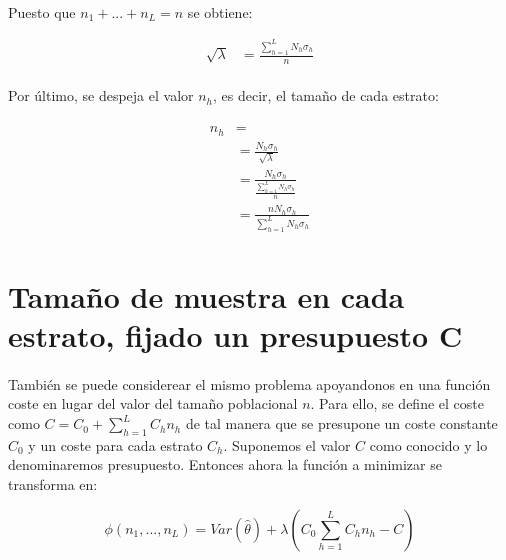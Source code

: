 \documentclass{article}
\begin{document}
      \paragraph{}
      Puesto que $n_1 + ... + n_L = n$ se obtiene:

      \begin{align}
        \sqrt{\lambda} &= \frac{\sum_{h=1}^L N_h \sigma_h }{n}
      \end{align}

      \paragraph{}
      Por último, se despeja el valor $n_h$, es decir, el tamaño de cada estrato:

      \begin{align}
        \begin{split}
          n_h &= \\
          &= \frac{N_h \sigma_h}{\sqrt{\lambda}}\\
          &= \frac{N_h \sigma_h}{\frac{\sum_{h=1}^L N_h \sigma_h }{n}}\\
          &= \frac{n N_h \sigma_h}{\sum_{h=1}^L N_h \sigma_h }
        \end{split}
      \end{align}

    \section{Tamaño de muestra en cada estrato, fijado un presupuesto C}
    \label{sec:dem_2}

      \paragraph{}
      También se puede considerear el mismo problema apoyandonos en una función coste en lugar del valor del tamaño poblacional $n$. Para ello, se define el coste como $C = C_0 + \sum_{h=1}^LC_hn_h$ de tal manera que se presupone un coste constante $C_0$ y un coste para cada estrato $C_h$. Suponemos el valor $C$ como conocido y lo denominaremos presupuesto. Entonces ahora la función a minimizar se transforma en:

      \begin{equation}
        \phi(n_1, ..., n_L) = Var(\widehat{\theta}) + \lambda \left( C_0 \sum_{h=1}^LC_hn_h - C\right)
      \end{equation}
\end{document}
